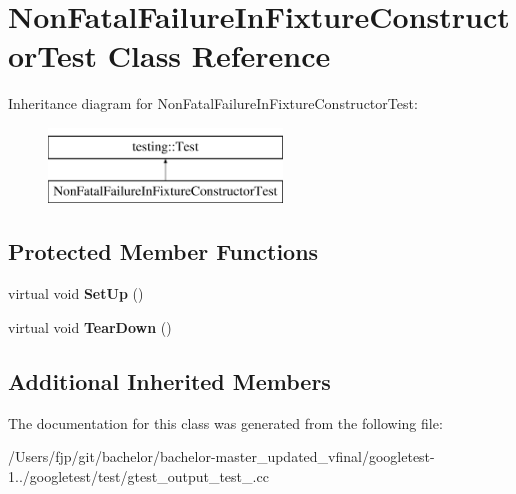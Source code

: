 \hypertarget{class_non_fatal_failure_in_fixture_constructor_test}{}\section{Non\+Fatal\+Failure\+In\+Fixture\+Constructor\+Test Class Reference}
\label{class_non_fatal_failure_in_fixture_constructor_test}
Inheritance diagram for Non\+Fatal\+Failure\+In\+Fixture\+Constructor\+Test\+:\begin{figure}[H]
\begin{center}
\leavevmode
\includegraphics[height=2.000000cm]{class_non_fatal_failure_in_fixture_constructor_test}
\end{center}
\end{figure}
\subsection*{Protected Member Functions}
\begin{DoxyCompactItemize}
\item 
\mbox{\label{class_non_fatal_failure_in_fixture_constructor_test_a7d951f8fbf7b2ac5046be8d8ee7b03d3}} 
virtual void {\bfseries Set\+Up} ()
\item 
\mbox{\label{class_non_fatal_failure_in_fixture_constructor_test_ab76d79c346d9a378d625fde5739e8ad6}} 
virtual void {\bfseries Tear\+Down} ()
\end{DoxyCompactItemize}
\subsection*{Additional Inherited Members}


The documentation for this class was generated from the following file\+:\begin{DoxyCompactItemize}
\item 
/\+Users/fjp/git/bachelor/bachelor-\/master\+\_\+updated\+\_\+vfinal/googletest-\/1../googletest/test/gtest\+\_\+output\+\_\+test\+\_\+.\+cc\end{DoxyCompactItemize}
